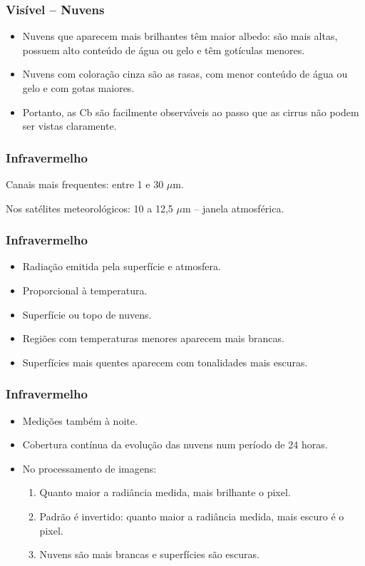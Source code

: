 \begin{frame}
\frametitle{Visível -- Nuvens}
  \begin{itemize}[<+-| alert@+>]
    \item Nuvens que aparecem mais brilhantes têm maior albedo: são mais altas,
          possuem alto conteúdo de água ou gelo e têm gotículas menores.
    \item Nuvens com coloração cinza são as rasas, com menor conteúdo de água
          ou gelo e com gotas maiores.
    \item Portanto, as Cb são facilmente observáveis ao passo que as cirrus não
          podem ser vistas claramente.
  \end{itemize}
\end{frame}


\begin{frame}
\frametitle{Infravermelho}
  \begin{block}{}
    Canais mais frequentes: entre 1 e 30 $\mu$m.
  \end{block}
  \pause
  \begin{block}{}
    Nos satélites
    meteorológicos: 10 a 12,5 $\mu$m -- janela atmosférica.
  \end{block}
\end{frame}


\begin{frame}
\frametitle{Infravermelho}
  \begin{itemize}[<+-| alert@+>]
    \item Radiação emitida pela superfície e atmosfera.
    \item Proporcional à temperatura.
    \item Superfície ou topo de nuvens.
    \item Regiões com temperaturas menores aparecem mais brancas.
    \item Superfícies mais quentes aparecem com tonalidades mais escuras.
  \end{itemize}
\end{frame}


\begin{frame}
\frametitle{Infravermelho}
  \begin{itemize}[<+-| alert@+>]
    \item Medições também à noite.
    \item Cobertura contínua da evolução das nuvens num período de 24 horas.
    \item No processamento de imagens:
      \begin{enumerate}
        \item Quanto maior a radiância medida, mais brilhante o pixel.
        \item Padrão é invertido: quanto maior a radiância medida, mais escuro é
              o pixel.
        \item Nuvens são mais brancas e superfícies são escuras.
      \end{enumerate}
  \end{itemize}
\end{frame}



